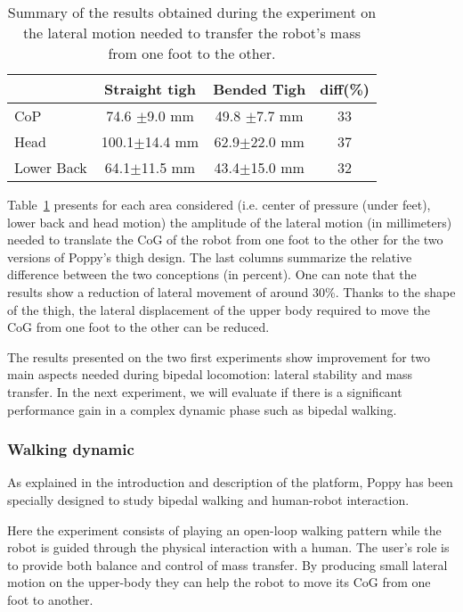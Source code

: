 \begin{table}[h]
\centering
\begin{tabular}{|l|c|c|c|}
  \hline &      Straight tigh &                     Bended Tigh &                   diff(\%) \\
  \hline CoP & 74.6 {\scriptsize$\pm$9.0} mm &     49.8 {\scriptsize$\pm$7.7} mm & 33\\
  Head & 100.1{\scriptsize$\pm$14.4} mm&     62.9{\scriptsize$\pm$22.0} mm &  37\\
  Lower Back & 64.1{\scriptsize$\pm$11.5} mm&      43.4{\scriptsize$\pm$15.0} mm &  32 \\
  \hline
\end{tabular}
\caption{Summary of the results obtained during the experiment on the lateral motion needed to transfer the robot’s mass from one foot to the other.}
\label{tab:CoG_motion}
\end{table}

Table~\ref{tab:CoG_motion} presents for each area considered (i.e. center of pressure (under feet), lower back and head motion) the amplitude of the lateral motion (in millimeters) needed to translate the CoG of the robot from one foot to the other for the two versions of Poppy’s thigh design. The last columns summarize the relative difference between the two conceptions (in percent). One can note that the results show a reduction of lateral movement of around 30\%. Thanks to the shape of the thigh, the lateral displacement of the upper body required to move the CoG from one foot to the other can be reduced.


The results presented on the two first experiments show improvement for two main aspects needed during bipedal locomotion: lateral stability and mass transfer. In the next experiment, we will evaluate if there is a significant performance gain in a complex dynamic phase such as bipedal walking.


\subsubsection{Walking dynamic} %
\label{sub:walking_dynamic}

As explained in the introduction and description of the platform, Poppy has been specially designed to study bipedal walking and human-robot interaction.

Here the experiment consists of playing an open-loop walking pattern while the robot is guided through the physical interaction with a human. The user’s role is to provide both balance and control of mass transfer. By producing small lateral motion on the upper-body they can help the robot to move its CoG from one foot to another.

